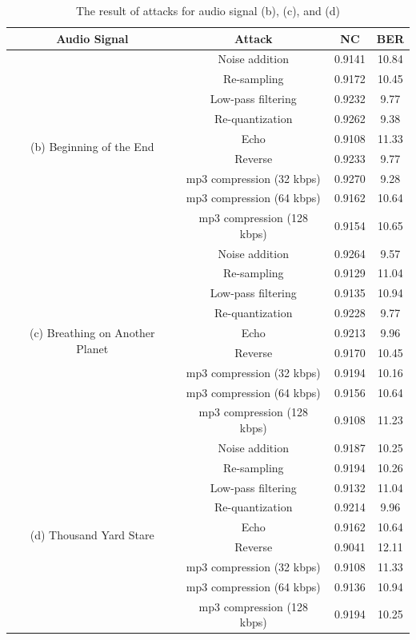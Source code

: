 \documentclass[12pt,a4paper]{report}
\begin{document}
\begin{table}[h!]
 \centering
\begin{tabular}{|c|c|c|c|}
\hline 
Audio Signal & Attack & NC & BER \\ 
\hline 
\multirow{9}{*}{(b) Beginning of the End} 
& Noise addition & 0.9141 & 10.84 \\
\cline{2-4}
& Re-sampling & 0.9172 & 10.45 \\
\cline{2-4}
& Low-pass filtering & 0.9232 & 9.77 \\
\cline{2-4}
& Re-quantization & 0.9262 & 9.38 \\
\cline{2-4}
& Echo & 0.9108 & 11.33 \\
\cline{2-4}
& Reverse & 0.9233 & 9.77 \\
\cline{2-4}
& mp3 compression (32 kbps) & 0.9270 & 9.28 \\
\cline{2-4}
& mp3 compression (64 kbps) & 0.9162 & 10.64 \\
\cline{2-4}
& mp3 compression (128 kbps) & 0.9154 & 10.65 \\
\hline

\multirow{9}{*}{(c) Breathing on Another Planet} 
& Noise addition & 0.9264 & 9.57 \\
\cline{2-4}
& Re-sampling & 0.9129 & 11.04 \\
\cline{2-4}
& Low-pass filtering & 0.9135 & 10.94 \\
\cline{2-4}
& Re-quantization & 0.9228 & 9.77 \\
\cline{2-4}
& Echo & 0.9213 & 9.96 \\
\cline{2-4}
& Reverse & 0.9170 & 10.45 \\
\cline{2-4}
& mp3 compression (32 kbps) & 0.9194 & 10.16 \\
\cline{2-4}
& mp3 compression (64 kbps) & 0.9156 & 10.64 \\
\cline{2-4}
& mp3 compression (128 kbps) & 0.9108 & 11.23 \\
\hline

\multirow{9}{*}{(d) Thousand Yard Stare} 
& Noise addition & 0.9187 & 10.25 \\
\cline{2-4}
& Re-sampling & 0.9194 & 10.26 \\
\cline{2-4}
& Low-pass filtering & 0.9132 & 11.04 \\
\cline{2-4}
& Re-quantization & 0.9214 & 9.96 \\
\cline{2-4}
& Echo & 0.9162 & 10.64 \\
\cline{2-4}
& Reverse & 0.9041 & 12.11 \\
\cline{2-4}
& mp3 compression (32 kbps) & 0.9108 & 11.33 \\
\cline{2-4}
& mp3 compression (64 kbps) & 0.9136 & 10.94 \\
\cline{2-4}
& mp3 compression (128 kbps) & 0.9194 & 10.25 \\
\hline
\end{tabular} 
 \newline
 \caption{The result of attacks for audio signal (b), (c), and (d)}
 \label{table:soundtwo}
\end{table}
\end{document}
